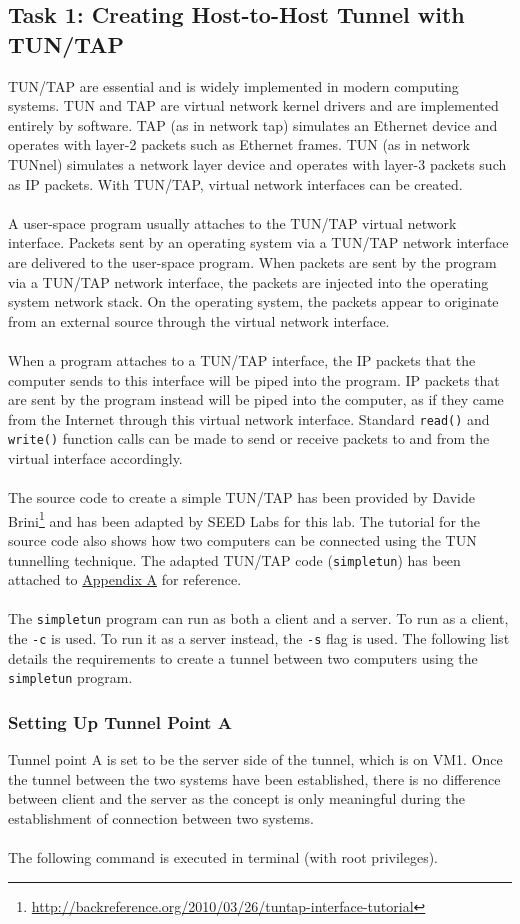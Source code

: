 \documentclass[a4paper,12pt]{article}
\begin{document}
	\subsection{Task 1: Creating Host-to-Host Tunnel with TUN/TAP}
	TUN/TAP are essential and is widely implemented in modern computing systems. TUN and TAP are virtual network kernel drivers and are implemented entirely by software. TAP (as in network tap) simulates an Ethernet device and operates with layer-2 packets such as Ethernet frames. TUN (as in network TUNnel) simulates a network layer device and operates with layer-3 packets such as IP packets. With TUN/TAP, virtual network interfaces can be created.\\\\A user-space program usually attaches to the TUN/TAP virtual network interface. Packets sent by an operating system via a TUN/TAP network interface are delivered to the user-space program. When packets are sent by the program via a TUN/TAP network interface, the packets are injected into the operating system network stack. On the operating system, the packets appear to originate from an external source through the virtual network interface. \\\\When a program attaches to a TUN/TAP interface, the IP packets that the computer sends to this interface will be piped into the program. IP packets that are sent by the program instead will be piped into the computer, as if they came from the Internet through this virtual network interface. Standard \texttt{read()} and \texttt{write()} function calls can be made to send or receive packets to and from the virtual interface accordingly.\\\\The source code to create a simple TUN/TAP has been provided by Davide Brini\footnote{\url{http://backreference.org/2010/03/26/tuntap-interface-tutorial}} and has been adapted by SEED Labs for this lab. The tutorial for the source code also shows how two computers can be connected using the TUN tunnelling technique. The adapted TUN/TAP code (\texttt{simpletun}) has been attached to \hyperref[ch:AppA]{Appendix A} for reference.
\\\\
	The \texttt{simpletun} program can run as both a client and a server. To run as a client, the \texttt{-c} is used. To run it as a server instead, the \texttt{-s} flag is used. The following list details the requirements to create a tunnel between two computers using the \texttt{simpletun} program.\subsubsection{Setting Up Tunnel Point A}Tunnel point A is set to be the server side of the tunnel, which is on VM1. Once the tunnel between the two systems have been established, there is no difference between client and the server as the concept is only meaningful during the establishment of connection between two systems.\\\\The following command is executed in terminal (with root privileges).
\end{document}
